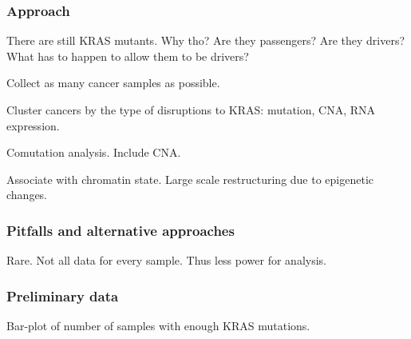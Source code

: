 \subsubsection*{Approach}

There are still KRAS mutants. 
Why tho? 
Are they passengers? 
Are they drivers?
What has to happen to allow them to be drivers?

Collect as many cancer samples as possible.

Cluster cancers by the type of disruptions to KRAS: mutation, CNA, RNA expression.

Comutation analysis.
Include CNA.

Associate with chromatin state. 
Large scale restructuring due to epigenetic changes.

\subsubsection*{Pitfalls and alternative approaches}

Rare.
Not all data for every sample.
Thus less power for analysis.

\subsubsection*{Preliminary data}

Bar-plot of number of samples with enough KRAS mutations.
